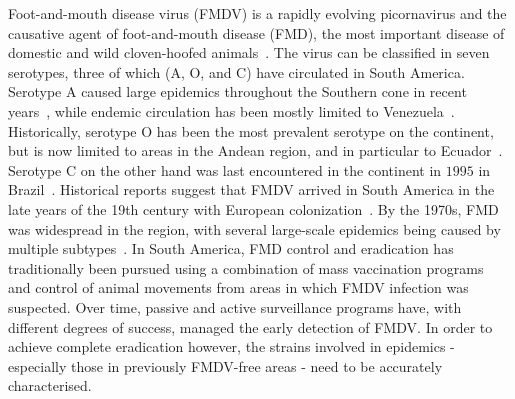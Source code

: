 \documentclass[10pt]{article}
\begin{document}
Foot-and-mouth disease virus (FMDV) is a rapidly evolving picornavirus and the causative agent of foot-and-mouth disease (FMD), the most important disease of domestic and wild cloven-hoofed animals~\cite{Grubman2004}.
The virus can be classified in seven serotypes, three of which (A, O, and C) have circulated in South America.
Serotype A caused large epidemics throughout the Southern cone in recent years~\cite{Perez2001, Malirat2012}, while endemic circulation has been mostly limited to Venezuela~\cite{Malirat2012}.
Historically, serotype O has been the most prevalent serotype on the continent, but is now limited to areas in the Andean region, and in particular to Ecuador~\cite{Malirat2011a}.
Serotype C on the other hand was last encountered in the continent in $1995$ in Brazil~\cite{Correa2002}.
Historical reports suggest that FMDV arrived in South America in the late years of the 19th century with European colonization~\cite{Naranjo2013, Tully2008}. 
By the 1970s, FMD was widespread in the region, with several large-scale epidemics being caused by multiple subtypes~\cite{Saraiva2003}.
In South America, FMD control and eradication has traditionally been pursued using a combination of mass vaccination programs~\cite{Saraiva2004b} and control of animal movements from areas in which FMDV infection was suspected.
Over time, passive and active surveillance programs have, with different degrees of success, managed the early detection of FMDV.
In order to achieve complete eradication however, the strains involved in epidemics - especially those in previously FMDV-free areas - need to be accurately characterised.
\end{document}
